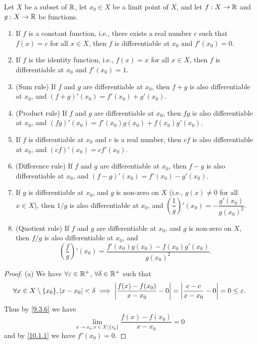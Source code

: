 \begin{thm}\label{10.1.13}
  Let \(X\) be a subset of \(\mathbb{R}\), let \(x_0 \in X\) be a limit point of \(X\), and let \(f : X \to \mathbb{R}\) and \(g : X \to \mathbb{R}\) be functions.
  \begin{enumerate}
    \item If \(f\) is a constant function, i.e., there exists a real number \(c\) such that \(f(x) = c\) for all \(x \in X\), then \(f\) is differentiable at \(x_0\) and \(f'(x_0) = 0\).
    \item If \(f\) is the identity function, i.e., \(f(x) = x\) for all \(x \in X\), then \(f\) is differentiable at \(x_0\) and \(f'(x_0) = 1\).
    \item (Sum rule)
          If \(f\) and \(g\) are differentiable at \(x_0\), then \(f + g\) is also differentiable at \(x_0\), and \((f + g)'(x_0) = f'(x_0) + g'(x_0)\).
    \item (Product rule)
          If \(f\) and \(g\) are differentiable at \(x_0\), then \(fg\) is also differentiable at \(x_0\), and \((fg)'(x_0) = f'(x_0)g(x_0) + f(x_0)g'(x_0)\).
    \item If \(f\) is differentiable at \(x_0\) and \(c\) is a real number, then \(cf\) is also differentiable at \(x_0\), and \((cf)'(x_0) = cf'(x_0)\).
    \item (Difference rule)
          If \(f\) and \(g\) are differentiable at \(x_0\), then \(f - g\) is also differentiable at \(x_0\), and \((f - g)'(x_0) = f'(x_0) - g'(x_0)\).
    \item If \(g\) is differentiable at \(x_0\), and \(g\) is non-zero on \(X\) (i.e., \(g(x) \neq 0\) for all \(x \in X\)), then \(1 / g\) is also differentiable at \(x_0\), and \((\dfrac{1}{g})'(x_0) = -\dfrac{g'(x_0)}{g(x_0)^2}\).
    \item (Quotient rule)
          If \(f\) and \(g\) are differentiable at \(x_0\), and \(g\) is non-zero on \(X\), then \(f / g\) is also differentiable at \(x_0\), and
          \[
            (\dfrac{f}{g})'(x_0) = \dfrac{f'(x_0) g(x_0) - f(x_0) g'(x_0)}{g(x_0)^2}.
          \]
  \end{enumerate}
\end{thm}

\begin{proof}{(a)}
  We have \(\forall \varepsilon \in \mathbb{R}^+\), \(\forall \delta \in \mathbb{R}^+\) such that
  \[
    \forall x \in X \setminus \{x_0\}, \left\lvert x - x_0\right\rvert < \delta \implies \left\lvert\dfrac{f(x) - f(x_0)}{x - x_0} - 0\right\rvert = \left\lvert\dfrac{c - c}{x - x_0} - 0\right\rvert = 0 \leq \varepsilon.
  \]
  Thus by \cref{9.3.6} we have
  \[
    \lim_{x \to x_0 ; x \in X \setminus \{x_0\}} \dfrac{f(x) - f(x_0)}{x - x_0} = 0
  \]
  and by \cref{10.1.1} we have \(f'(x_0) = 0\).
\end{proof}

